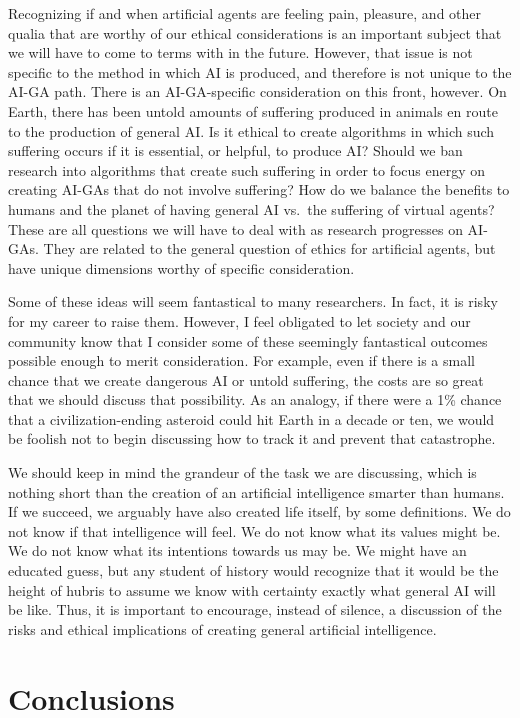 \documentclass{article}
\begin{document}
Recognizing if and when artificial agents are feeling pain, pleasure, and other qualia that are worthy of our ethical considerations is an important subject that we will have to come to terms with in the future. However, that issue is not specific to the method in which AI is produced, and therefore is not unique to the AI-GA path. There is an AI-GA-specific consideration on this front, however. On Earth, there has been untold amounts of suffering produced in animals en route to the production of general AI. Is it ethical to create algorithms in which such suffering occurs if it is essential, or helpful, to produce AI? Should we ban research into algorithms that create such suffering in order to focus energy on creating AI-GAs that do not involve suffering? How do we balance the benefits to humans and the planet of having general AI vs.\ the suffering of virtual agents? These are all questions we will have to deal with as research progresses on AI-GAs. They are related to the general question of ethics for artificial agents, but have unique dimensions worthy of specific consideration. 

Some of these ideas will seem fantastical to many researchers. In fact, it is risky for my career to raise them. However, I feel obligated to let society and our community know that I consider some of these seemingly fantastical outcomes possible enough to merit consideration. For example, even if there is a small chance that we create dangerous AI or untold suffering, the costs are so great that we should discuss that possibility. As an analogy, if there were a 1\% chance that a civilization-ending asteroid could hit Earth in a decade or ten, we would be foolish not to begin discussing how to track it and prevent that catastrophe.  

We should keep in mind the grandeur of the task we are discussing, which is nothing short than the creation of an artificial intelligence smarter than humans. If we succeed, we arguably have also created life itself, by some definitions. We do not know if that intelligence will feel. We do not know what its values might be. We do not know what its intentions towards us may be. We might have an educated guess, but any student of history would recognize that it would be the height of hubris to assume we know with certainty exactly what general AI will be like. Thus, it is important to encourage, instead of silence, a discussion of the risks and ethical implications of creating general artificial intelligence. 

\section{Conclusions}
\end{document}
